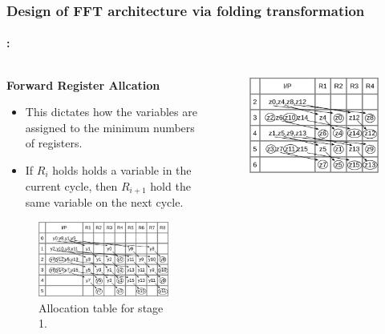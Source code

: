 \begin{frame}
	\frametitle{\textbf{Design of FFT architecture via folding transformation}}
	\framesubtitle{\secname : \subsecname}
	\vspace{-0.5cm}
	 \begin{columns}[t,onlytextwidth]
	      \begin{column}{0.5\linewidth}
			\begin{block}{\centering \textbf{Forward Register Allcation}}
				\begin{itemize}\justifying\footnotesize
		        	\item This dictates how the variables are assigned to the minimum numbers of registers. \vfill
		        	\item If $R_i$ holds holds a variable in the current cycle, then $R_{i+1}$ hold the same variable on the next cycle.
		       	\end{itemize}
			\end{block}
			\vspace{-0.3cm}
			\begin{figure}[h!] \centering
	    		\includegraphics[height=0.30\paperheight]{./image/tab-life-a.png}
	    		\caption{\footnotesize Allocation table for stage 1.}
	    	\end{figure}
   		  \end{column}
   		  \begin{column}{0.45\linewidth}
   			\begin{figure}[h!] \centering
	    		\includegraphics[height=0.25\paperheight]{./image/tab-life-b.png}

\end{figure}
\end{column}
\end{columns}
\end{frame}
